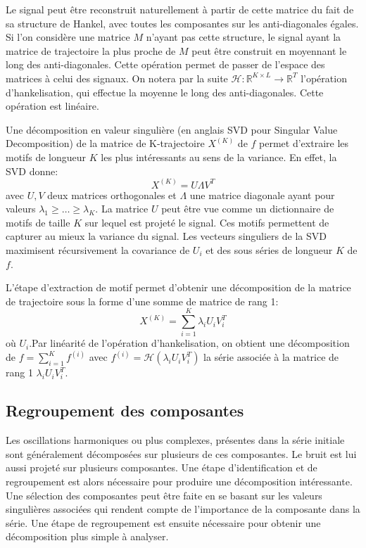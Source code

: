 \documentclass{gretsi}
\def\HH{\mathcal H}
\newcommand{\R}{\mathbb R}
\begin{document}
Le signal peut être reconstruit naturellement à partir de cette matrice du fait de sa structure de Hankel, avec toutes les composantes sur les anti-diagonales égales. Si l'on considère une matrice $M$ n'ayant pas cette structure, le signal ayant la matrice de trajectoire la plus proche de $M$ peut être construit en moyennant le long des anti-diagonales. Cette opération permet de  passer de l'espace des matrices à celui des signaux. On notera par la suite $\HH: \R^{K\times L} \to \R^T$ l'opération d'hankelisation, qui effectue la moyenne le long des anti-diagonales. Cette opération est linéaire.



Une décomposition en valeur singulière (en anglais SVD pour Singular Value Decomposition) de la matrice de K-trajectoire $X^{(K)}$ de $f$ permet d'extraire les motifs de longueur $K$ les plus intéressants au sens de la variance. En effet, la SVD donne: 
$$X^{(K)} = U \Lambda V^T
$$ avec $U, V$ deux matrices orthogonales et $\Lambda$ une matrice diagonale ayant pour valeurs $\lambda_1\ge \dots\ge \lambda_K$. La matrice $U$ peut être vue comme un dictionnaire de motifs de taille $K$ sur lequel est projeté le signal. Ces motifs permettent de capturer au mieux la variance du signal. Les vecteurs singuliers de la SVD maximisent récursivement la covariance de $U_i$ et des sous séries de longueur $K$ de $f$.



L'étape d'extraction de motif permet d'obtenir une décomposition de la matrice de trajectoire sous la forme d'une somme de matrice de rang 1:$$
X^{(K)} = \sum_{i=1}^K \lambda_i U_iV_i^T 
$$où  $U_i$.Par linéarité de l'opération d'hankelisation, on obtient une décomposition de $f = \sum_{i=1}^K f^{(i)}$ avec $f^{(i)} = \HH(\lambda_iU_iV_i^T)$ la série associée à la matrice de rang 1 $\lambda_iU_iV_i^T$.


\subsection{Regroupement des composantes}
\label{sub:grp}

Les oscillations harmoniques ou plus complexes, présentes dans la série initiale sont généralement décomposées sur plusieurs de ces composantes. Le bruit est lui aussi projeté sur plusieurs composantes. Une étape d'identification et de regroupement est alors nécessaire pour produire une décomposition intéressante. Une sélection des composantes peut être faite en se basant sur les valeurs singulières associées qui rendent compte de l'importance de la composante dans la série. Une étape de regroupement est ensuite nécessaire pour obtenir une décomposition plus simple à analyser.
\end{document}
